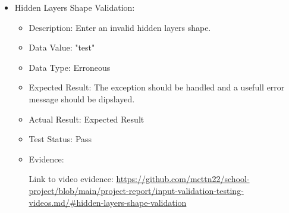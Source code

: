 \documentclass[./project-report/src/latex/project-report.tex]{subfiles}
\begin{document}
\begin{itemize}
\begin{itemize}
        \item Hidden Layers Shape Validation:
            \begin{itemize}
                \item Description: Enter an invalid hidden layers shape.
                \item Data Value: "test"
                \item Data Type: Erroneous
                \item Expected Result: The exception should be handled and a usefull error message should be dipslayed.
                \item Actual Result: Expected Result
                \item Test Status: Pass
                \item Evidence:
                    \begin{figure}[h!]
                    \centering
                    \end{figure}

                    Link to video evidence: \url{https://github.com/mcttn22/school-project/blob/main/project-report/input-validation-testing-videos.md/#hidden-layers-shape-validation}
            \end{itemize}
    \end{itemize}

    \pagebreak


\end{itemize}
\end{document}
